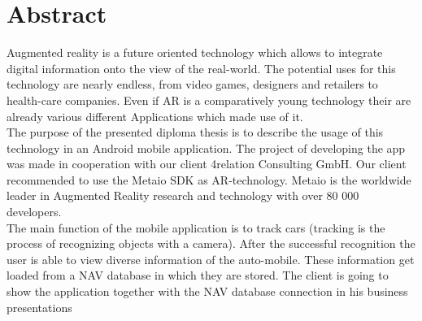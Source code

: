 \chapter*{Abstract}

Augmented reality is a future oriented technology which allows to integrate digital information onto the view of the real-world. The potential uses for this technology are nearly endless, from video games, designers and retailers to health-care companies. Even if AR is a comparatively young technology their are already various different Applications which made use of it.          
\\

The purpose of the presented diploma thesis is to describe the usage of this technology in an Android mobile application. The project of developing the app was made in cooperation with our client 4relation Consulting GmbH. Our client recommended to use the Metaio SDK as AR-technology. Metaio is the worldwide leader in Augmented Reality research and technology with over 80 000 developers.
\\

The main function of the mobile application is to track cars (tracking is the process of recognizing objects with a camera). After the successful recognition the user is able to view diverse information of the auto-mobile. These information get loaded from a NAV database in which they are stored. The client is going to show the application together with the NAV database connection in his business presentations        